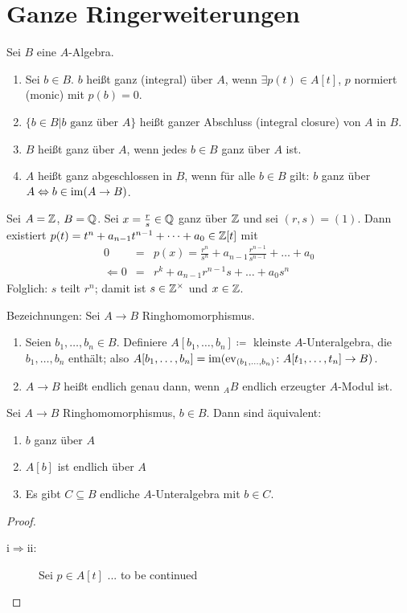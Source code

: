 \documentclass[12pt,a4paper]{scrartcl}
\theoremstyle{cplain}
\theoremstyle{cdef}
\begin{document}
\section{Ganze Ringerweiterungen}
Sei $B$ eine $A$-Algebra.
\begin{defi}
	\leavevmode
	\begin{enumerate}
		\item Sei $b\in B$. $b$ heißt ganz (\glqq integral\grqq) über $A$, wenn $\exists p(t)\in A[t]$, $p$ normiert (\glqq monic\grqq) mit $p(b) = 0$.
		\item $\{b\in B|b \text{ ganz über } A\}$ heißt ganzer Abschluss (\glqq integral closure\grqq) von $A$ in $B$.
		\item $B$ heißt ganz über $A$, wenn jedes $b\in B$ ganz über $A$ ist.
		\item $A$ heißt ganz abgeschlossen in $B$, wenn für alle $b\in B$ gilt: $b$ ganz über $A\Leftrightarrow b\in\operatorname{im} (A\to B)$.
	\end{enumerate}
\end{defi}
\begin{bsp}
	Sei $A = \mathbb Z$, $B = \mathbb Q$. Sei $x = \frac rs\in \mathbb Q$ ganz über $\mathbb Z$ und sei $(r,s) = (1)$. Dann existiert $p(t) = t^{n}+a_{n-1}t^{n-1}+\dots + a_0\in\mathbb Z[t]$ mit 
	\begin{eqnarray*}
		 0 &=& p(x) = \frac{r^n}{s^n}+a_{n-1}\frac{r^{n-1}}{s^{n-1}}+\dots+a_0\\
		 \Leftarrow 0 &=& r^k + a_{n-1}r^{n-1}s+\dots+ a_0s^{n}
	\end{eqnarray*}
	Folglich: $s$ teilt $r^n$; damit ist $s\in \mathbb Z^{\times}$ und $x\in\mathbb Z$.
\end{bsp}
Bezeichnungen: Sei $A\to B$ Ringhomomorphismus.
\begin{enumerate}
	\item Seien $b_1,\dots,b_n\in B$. Definiere $A[b_1,\dots, b_n]\coloneqq$ kleinste $A$-Unteralgebra, die $b_1,\dots, b_n$ enthält; also $A[b_1,\dots, b_n] = \operatorname{im} (\operatorname{ev}_{(b_1,\dots, b_n)}\colon A[t_1,\dots, t_n]\to B)$.
	\item $A\to B$ heißt endlich genau dann, wenn ${}_AB$ endlich erzeugter $A$-Modul ist.
\end{enumerate}


\begin{lem}
	Sei $A\to B$ Ringhomomorphismus, $b\in B$. Dann sind äquivalent:
	\begin{enumerate}
		\item $b$ ganz über $A$
		\item $A[b]$ ist endlich über $A$
		\item Es gibt $C\subseteq B$ endliche $A$-Unteralgebra mit $b\in C$.
	\end{enumerate}
\end{lem}
\begin{proof}
	\leavevmode
	\begin{description}
		\item[i$\Rightarrow$ii:] Sei $p\in A[t]$
		... to be continued
	\end{description}
\end{proof}
\end{document}
